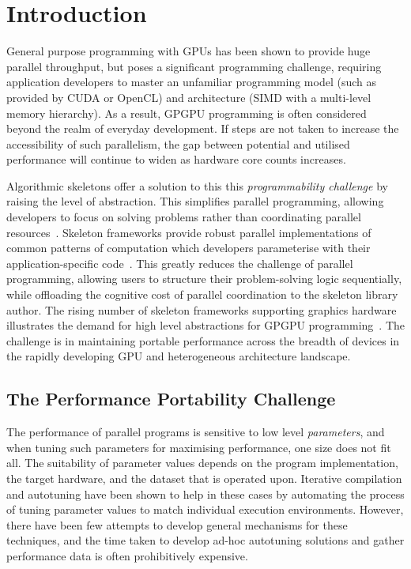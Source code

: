 \documentclass[nonatbib,preprint,9pt]{sigplanconf}
\begin{document}
\section{Introduction}\label{sec:introduction}

General purpose programming with GPUs has been shown to provide huge
parallel throughput, but poses a significant programming challenge,
requiring application developers to master an unfamiliar programming
model (such as provided by CUDA or OpenCL) and architecture (SIMD with
a multi-level memory hierarchy). As a result, GPGPU programming is
often considered beyond the realm of everyday development. If steps
are not taken to increase the accessibility of such parallelism, the
gap between potential and utilised performance will continue to widen
as hardware core counts increases.

Algorithmic skeletons offer a solution to this this
\emph{programmability challenge} by raising the level of
abstraction. This simplifies parallel programming, allowing developers
to focus on solving problems rather than coordinating parallel
resources~\cite{Cole1989}. Skeleton frameworks provide robust parallel
implementations of common patterns of computation which developers
parameterise with their application-specific
code~\cite{Gonzalez2010}. This greatly reduces the challenge of
parallel programming, allowing users to structure their
problem-solving logic sequentially, while offloading the cognitive
cost of parallel coordination to the skeleton library author. The
rising number of skeleton frameworks supporting graphics hardware
illustrates the demand for high level abstractions for GPGPU
programming~\cite{Enmyren2010, Marques2013, Nugteren2014a}. The
challenge is in maintaining portable performance across the breadth of
devices in the rapidly developing GPU and heterogeneous architecture
landscape.


\subsection{The Performance Portability Challenge}

The performance of parallel programs is sensitive to low level
\emph{parameters}, and when tuning such parameters for maximising
performance, one size does not fit all. The suitability of parameter
values depends on the program implementation, the target hardware, and
the dataset that is operated upon. %
Iterative compilation and autotuning have been shown to help in these
cases by automating the process of tuning parameter values to match
individual execution environments. %
However, there have been few attempts to develop general mechanisms
for these techniques, and the time taken to develop ad-hoc autotuning
solutions and gather performance data is often prohibitively
expensive.
\end{document}
